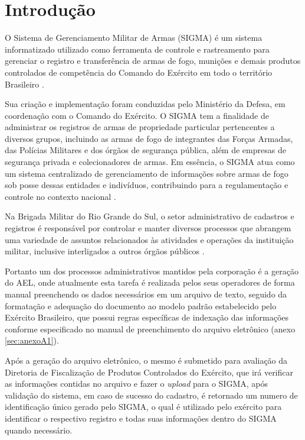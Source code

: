 \chapter{Introdução}

O Sistema de Gerenciamento Militar de Armas (SIGMA) é um sistema informatizado utilizado como ferramenta de controle e rastreamento para gerenciar o registro e transferência de armas de fogo, munições e demais produtos controlados de competência do Comando do Exército em todo o território Brasileiro 
\cite{ExércitoBrasileiro}.

Sua criação e implementação foram conduzidas pelo Ministério da Defesa, em coordenação com o Comando do Exército. O SIGMA tem a finalidade de administrar os registros de armas de propriedade particular pertencentes a diversos grupos, incluindo as armas de fogo de integrantes das Forças Armadas, das Polícias Militares e dos órgãos de segurança pública, além de empresas de segurança privada e colecionadores de armas. Em essência, o SIGMA atua como um sistema centralizado de gerenciamento de informações sobre armas de fogo sob posse dessas entidades e indivíduos, contribuindo para a regulamentação e controle no contexto nacional
\cite{ExércitoBrasileiro}.


Na Brigada Militar do Rio Grande do Sul, o setor administrativo de cadastros e registros é responsável por controlar e manter diversos processos que abrangem uma variedade de assuntos relacionados às atividades e operações da instituição militar, inclusive interligados a outros órgãos públicos
\cite{bmDepartamentoAdministrativo}.

Portanto um dos processos administrativos mantidos pela corporação é a geração do AEL, onde atualmente esta tarefa é realizada pelos seus operadores de forma manual preenchendo os dados necessários em um arquivo de texto, seguido da formatação e adequação do documento ao modelo padrão estabelecido pelo Exército Brasileiro, que possui regras específicas de indexação das informações conforme especificado no manual de preenchimento do arquivo eletrônico (anexo \ref{sec:anexoA1}). 

Após a geração do arquivo eletrônico, o mesmo é submetido para avaliação da Diretoria de Fiscalização de Produtos Controlados do Exército, que irá verificar as informações contidas no arquivo e fazer o \textit{upload} para o SIGMA, após validação do sistema, em caso de sucesso do cadastro, é retornado um numero de identificação único gerado pelo SIGMA, o qual é utilizado pelo exército para identificar o respectivo registro e todas suas informações dentro do SIGMA quando necessário\cite{ExércitoBrasileiro}.

